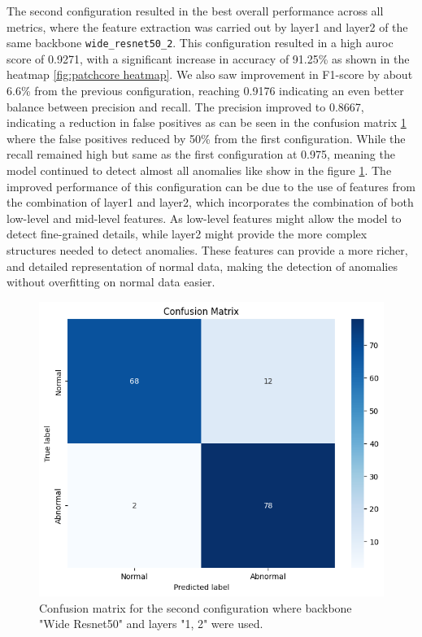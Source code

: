 The second configuration resulted in the best overall performance across all metrics, where the feature extraction was carried out by layer1 and layer2 of the same backbone \texttt{wide\_resnet50\_2}. This configuration resulted in a high \gls{auroc} score of 0.9271, with a significant increase in accuracy of 91.25\% as shown in the heatmap \ref{fig:patchcore heatmap}. We also saw improvement in F1-score by about 6.6\% from the previous configuration, reaching 0.9176 indicating an even better balance between precision and recall. The precision improved to 0.8667, indicating a reduction in false positives as can be seen in the confusion matrix \ref{fig:patchcore config2 confusion matrix} where the false positives reduced by 50\% from the first configuration. While the recall remained high but same as the first configuration at 0.975, meaning the model continued to detect almost all anomalies like show in the figure \ref{fig:patchcore config2 confusion matrix}. The improved performance of this configuration can be due to the use of features from the combination of layer1 and layer2, which incorporates the combination of both low-level and mid-level features. As low-level features might allow the model to detect fine-grained details, while layer2 might provide the more complex structures needed to detect anomalies. These features can provide a more richer, and detailed representation of normal data, making the detection of anomalies without overfitting on normal data easier.

\begin{figure}[ht!]
    \centering
    \includegraphics[width=1\linewidth]{Rohit_Master_Thesis//Images/patchcore_config2_confusion_matrix.jpg}
    \caption{Confusion matrix for the second configuration where backbone "Wide Resnet50" and layers "1, 2" were used.}
    \label{fig:patchcore config2 confusion matrix}
\end{figure}

